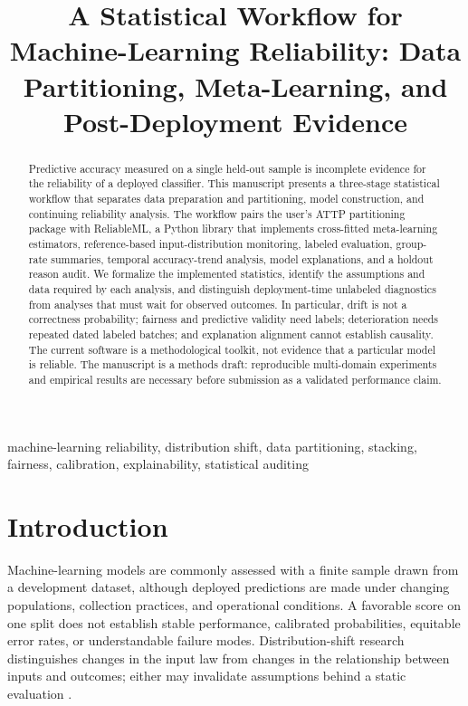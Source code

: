 \documentclass[conference]{IEEEtran}
\title{A Statistical Workflow for Machine-Learning Reliability: Data Partitioning, Meta-Learning, and Post-Deployment Evidence}
\author{
\jabulaniauthor
\and
\martinchanzauthor
\and
\oloratoauthor
\and
\mfundoauthor
}
\begin{document}
\maketitle

\begin{abstract}
Predictive accuracy measured on a single held-out sample is incomplete evidence for the reliability of a deployed classifier. This manuscript presents a three-stage statistical workflow that separates data preparation and partitioning, model construction, and continuing reliability analysis. The workflow pairs the user's ATTP partitioning package with ReliableML, a Python library that implements cross-fitted meta-learning estimators, reference-based input-distribution monitoring, labeled evaluation, group-rate summaries, temporal accuracy-trend analysis, model explanations, and a holdout reason audit. We formalize the implemented statistics, identify the assumptions and data required by each analysis, and distinguish deployment-time unlabeled diagnostics from analyses that must wait for observed outcomes. In particular, drift is not a correctness probability; fairness and predictive validity need labels; deterioration needs repeated dated labeled batches; and explanation alignment cannot establish causality. The current software is a methodological toolkit, not evidence that a particular model is reliable. The manuscript is a methods draft: reproducible multi-domain experiments and empirical results are necessary before submission as a validated performance claim.
\end{abstract}

\begin{IEEEkeywords}
machine-learning reliability, distribution shift, data partitioning, stacking, fairness, calibration, explainability, statistical auditing
\end{IEEEkeywords}

\section{Introduction}
Machine-learning models are commonly assessed with a finite sample drawn from a development dataset, although deployed predictions are made under changing populations, collection practices, and operational conditions. A favorable score on one split does not establish stable performance, calibrated probabilities, equitable error rates, or understandable failure modes. Distribution-shift research distinguishes changes in the input law from changes in the relationship between inputs and outcomes; either may invalidate assumptions behind a static evaluation \cite{gama2014}.
\end{document}
